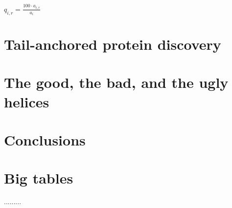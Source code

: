 \documentclass[12pt,PhD,twoside]{muthesis}
\begin{document}
$q_{i,r}=\frac{100·a_{i,r}}{a_i}$

\chapter{Tail-anchored protein discovery} %

\chapter{The good, the bad, and the ugly helices} %

\chapter{Conclusions}

\printglossary[type=\acronymtype,title=Abbreviations]
\printglossary[title=Nomenclature] %

\printbibliography[title={Bibliography}]

\appendix
\chapter{Big tables}
.........
\end{document}
